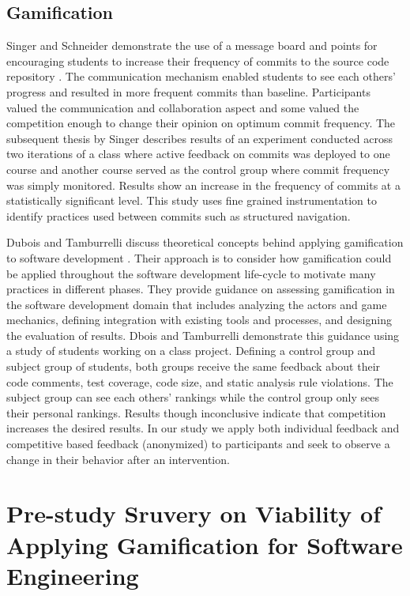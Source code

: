\documentclass{sig-alternate}
\begin{document}
\subsection{Gamification}
Singer and Schneider demonstrate the use of a message board and points for encouraging students to increase their frequency of commits to the source code repository \cite{Singer2012It}.  The communication mechanism enabled students to see each others' progress and resulted in more frequent commits than baseline.  Participants valued the communication and collaboration aspect and some valued the competition enough to change their opinion on optimum commit frequency.  The subsequent thesis by Singer \cite{Singer2013a} describes results of an experiment conducted across two iterations of a class where active feedback on commits was deployed to one course and another course served as the control group where commit frequency was simply monitored.  Results show an increase in the frequency of commits at a statistically significant level.  This study uses fine grained instrumentation to identify practices used between commits such as structured navigation.

Dubois and Tamburrelli discuss theoretical concepts behind applying gamification to software development \cite{Dubois2013Understanding}. Their approach is to consider how gamification could be applied throughout the software development life-cycle to motivate many practices in different phases.  They provide guidance on assessing gamification in the software development domain that includes analyzing the actors and game mechanics, defining integration with existing tools and processes, and designing the evaluation of results.  Dbois and Tamburrelli demonstrate this guidance using a study of students working on a class project.  Defining a control group and subject group of students, both groups receive the same feedback about their code comments, test coverage, code size, and static analysis rule violations.  The subject group can see each others' rankings while the control group only sees their personal rankings.  Results though inconclusive indicate that competition increases the desired results.  In our study we apply both individual feedback and competitive based feedback (anonymized) to participants and seek to observe a change in their behavior after an intervention.

\section{Pre-study Sruvery on Viability of Applying Gamification for Software Engineering}
\end{document}
